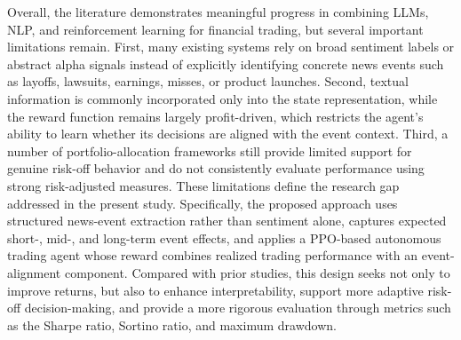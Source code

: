 \documentclass[a4paper,fleqn]{cas-sc}
\begin{document}
Overall, the literature demonstrates meaningful progress in combining LLMs, NLP, and reinforcement learning for financial trading, but several important limitations remain. First, many existing systems rely on broad sentiment labels or abstract alpha signals instead of explicitly identifying concrete news events such as layoffs, lawsuits, earnings, misses, or product launches. Second, textual information is commonly incorporated only into the state representation, while the reward function remains largely profit-driven, which restricts the agent’s ability to learn whether its decisions are aligned with the event context. Third, a number of portfolio-allocation frameworks still provide limited support for genuine risk-off behavior and do not consistently evaluate performance using strong risk-adjusted measures. These limitations define the research gap addressed in the present study. Specifically, the proposed approach uses structured news-event extraction rather than sentiment alone, captures expected short-, mid-, and long-term event effects, and applies a PPO-based autonomous trading agent whose reward combines realized trading performance with an event-alignment component. Compared with prior studies, this design seeks not only to improve returns, but also to enhance interpretability, support more adaptive risk-off decision-making, and provide a more rigorous evaluation through metrics such as the Sharpe ratio, Sortino ratio, and maximum drawdown. 
\end{document}

